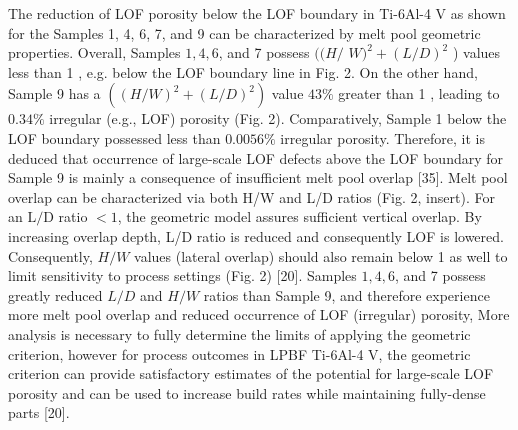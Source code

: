 \documentclass[10pt]{article}
\begin{document}
The reduction of LOF porosity below the LOF boundary in Ti-6Al-4 V as shown for the Samples 1, 4, 6, 7, and 9 can be characterized by melt pool geometric properties. Overall, Samples $1,4,6$, and 7 possess $((H /$ $W)^{2}+(L / D)^{2}$ ) values less than 1 , e.g. below the LOF boundary line in Fig. 2. On the other hand, Sample 9 has a $\left((H / W)^{2}+(L / D)^{2}\right)$ value $43 \%$ greater than 1 , leading to $0.34 \%$ irregular (e.g., LOF) porosity (Fig. 2). Comparatively, Sample 1 below the LOF boundary possessed less than $0.0056 \%$ irregular porosity. Therefore, it is deduced that occurrence of large-scale LOF defects above the LOF boundary for Sample 9 is mainly a consequence of insufficient melt pool overlap [35]. Melt pool overlap can be characterized via both H/W and L/D ratios (Fig. 2, insert). For an $\mathrm{L} / \mathrm{D}$ ratio $<1$, the geometric model assures sufficient vertical overlap. By increasing overlap depth, L/D ratio is reduced and consequently LOF is lowered. Consequently, $H / W$ values (lateral overlap) should also remain below 1 as well to limit sensitivity to process settings (Fig. 2) [20]. Samples $1,4,6$, and 7 possess greatly reduced $L / D$ and $H / W$ ratios than Sample 9, and therefore experience more melt pool overlap and reduced occurrence of LOF (irregular) porosity, More analysis is necessary to fully determine the limits of applying the geometric criterion, however for process outcomes in LPBF Ti-6Al-4 V, the geometric criterion can provide satisfactory estimates of the potential for large-scale LOF porosity and can be used to increase build rates while maintaining fully-dense parts [20].
\end{document}
